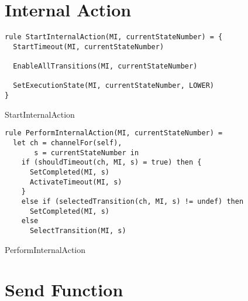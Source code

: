 \section{Internal Action}


\begin{listing}[H]
\begin{verbatim}
rule StartInternalAction(MI, currentStateNumber) = {
  StartTimeout(MI, currentStateNumber)

  EnableAllTransitions(MI, currentStateNumber)

  SetExecutionState(MI, currentStateNumber, LOWER)
}
\end{verbatim}
\caption{StartInternalAction}
\label{lst:asm:StartInternalAction}
\end{listing}




\begin{listing}[H]
\begin{verbatim}
rule PerformInternalAction(MI, currentStateNumber) =
  let ch = channelFor(self),
       s = currentStateNumber in
    if (shouldTimeout(ch, MI, s) = true) then {
      SetCompleted(MI, s)
      ActivateTimeout(MI, s)
    }
    else if (selectedTransition(ch, MI, s) != undef) then
      SetCompleted(MI, s)
    else
      SelectTransition(MI, s)
\end{verbatim}
\caption{PerformInternalAction}
\label{lst:asm:PerformInternalAction}
\end{listing}







\section{Send Function}


